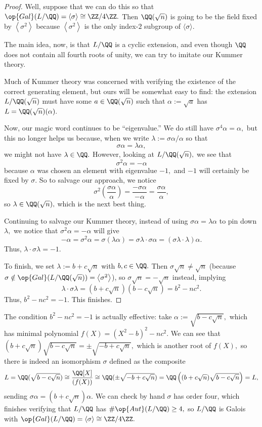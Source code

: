 \documentclass[../notes.tex]{subfiles}
\begin{document}
\begin{proof}
	Well, suppose that we can do this so that $\op{Gal}(L/\QQ)=\langle\sigma\rangle\cong\ZZ/4\ZZ.$ Then $\QQ(\sqrt n)$ is going to be the field fixed by $\left\langle\sigma^2\right\rangle$ because $\left\langle\sigma^2\right\rangle$ is the only index-$2$ subgroup of $\langle\sigma\rangle.$

	The main idea, now, is that $L/\QQ$ is a cyclic extension, and even though $\QQ$ does not contain all fourth roots of unity, we can try to imitate our Kummer theory.

	Much of Kummer theory was concerned with verifying the existence of the correct generating element, but ours will be somewhat easy to find: the extension $L/\QQ(\sqrt n)$ must have some $a\in\QQ(\sqrt n)$ such that $\alpha:=\sqrt a$ has $L=\QQ(\sqrt n)(\alpha).$
	
	Now, our magic word continues to be ``eigenvalue.'' We do still have $\sigma^4\alpha=\alpha,$ but this no longer helps us because, when we write $\lambda:=\sigma\alpha/\alpha$ so that
	\[\sigma\alpha=\lambda\alpha,\]
	we might not have $\lambda\in\QQ.$ However, looking at $L/\QQ(\sqrt n),$ we see that
	\[\sigma^2\alpha=-\alpha\]
	because $\alpha$ was chosen an element with eigenvalue $-1,$ and $-1$ will certainly be fixed by $\sigma.$ So to salvage our approach, we notice
	\[\sigma^2\left(\frac{\sigma\alpha}\alpha\right)=\frac{-\sigma\alpha}{-\alpha}=\frac{\sigma\alpha}\alpha,\]
	so $\lambda\in\QQ(\sqrt n),$ which is the next best thing.
	
	Continuing to salvage our Kummer theory, instead of using $\sigma\alpha=\lambda\alpha$ to pin down $\lambda,$ we notice that $\sigma^2\alpha=-\alpha$ will give
	\[-\alpha=\sigma^2\alpha=\sigma(\lambda\alpha)=\sigma\lambda\cdot\sigma\alpha=(\sigma\lambda\cdot\lambda)\alpha.\]
	Thus, $\lambda\cdot\sigma\lambda=-1.$

	To finish, we set $\lambda:=b+c\sqrt n$ with $b,c\in\QQ.$ Then $\sigma\sqrt n\ne\sqrt n$ (because $\sigma\notin\op{Gal}(L/\QQ(\sqrt n))=\left\langle\sigma^2\right\rangle$), so $\sigma\sqrt n=-\sqrt n$ instead, implying
	\[\lambda\cdot\sigma\lambda=\left(b+c\sqrt n\right)\left(b-c\sqrt n\right)=b^2-nc^2.\]
	Thus, $b^2-nc^2=-1.$ This finishes.
\end{proof}
\begin{remark}[Nir]
	The condition $b^2-nc^2=-1$ is actually effective: take $\alpha:=\sqrt{b-c\sqrt n},$ which has minimal polynomial $f(X)=\left(X^2-b\right)^2-nc^2.$ We can see that $\left(b+c\sqrt n\right)\sqrt{b-c\sqrt n}=\pm\sqrt{-b+c\sqrt n},$ which is another root of $f(X),$ so there is indeed an isomorphism $\sigma$ defined as the composite
	\[L=\QQ({\textstyle\sqrt{b-c\sqrt n}})\cong\frac{\QQ[X]}{(f(X))}\cong\QQ(\pm\textstyle\sqrt{-b+c\sqrt n})=\QQ\left((b+c\sqrt n)\textstyle\sqrt{b-c\sqrt n}\right)=L,\]
	sending $\sigma\alpha=(b+c\sqrt n)\alpha.$ We can check by hand $\sigma$ has order four, which finishes verifying that $L/\QQ$ has $\#\op{Aut}(L/\QQ)\ge4,$ so $L/\QQ$ is Galois with $\op{Gal}(L/\QQ)=\langle\sigma\rangle\cong\ZZ/4\ZZ.$
\end{remark}
\end{document}
